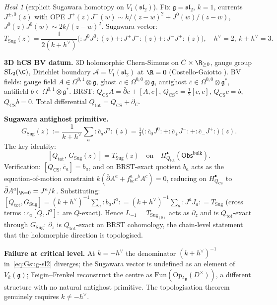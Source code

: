 \documentclass{article}
\theoremstyle{definition}
\theoremstyle{remark}
\newtheorem{heal}[theorem]{Heal}
\newcommand{\Obs}{\mathsf{Obs}}
\newcommand{\fg}{\mathfrak{g}}
\newcommand{\fsl}{\mathfrak{sl}}
\newcommand{\cA}{\mathcal{A}}
\newcommand{\Sug}{T_{\mathrm{Sug}}}
\newcommand{\Gsug}{G_{\mathrm{Sug}}}
\newcommand{\hv}{h^{\vee}}
\newcommand{\nord}[1]{{:}#1{:}}
\begin{document}
\begin{heal}[explicit Sugawara homotopy on $V_1(\fsl_2)$]
Fix $\fg = \fsl_2$, $k = 1$, currents $J^{\pm, 0}(z)$ with OPE
$J^+(z)J^-(w) \sim k/(z-w)^2 + J^0(w)/(z-w)$,
$J^0(z)J^0(w)\sim 2k/(z-w)^2$. Sugawara vector:
\begin{equation}\label{eq:sug-sl2}
 \Sug(z) = \frac{1}{2(k+\hv)}\bigl(
 \nord{J^0 J^0}(z) + \nord{J^+ J^-}(z) + \nord{J^- J^+}(z)\bigr),
 \quad \hv = 2,\ k+\hv = 3.
\end{equation}

\textbf{3D hCS BV datum.} 3D holomorphic Chern-Simons on
$C\times\R_{\geq 0}$, gauge group $\mathrm{SL}_2(\C)$, Dirichlet
boundary $\cA = V_1(\fsl_2)$ at $\R = 0$ (Costello-Gaiotto
\cite{CostelloGaiotto}). BV fields: gauge field $A\in\Omega^{0,1}
\otimes\fg$, ghost $c\in\Omega^{0,0}\otimes\fg$, antighost
$\bar c\in\Omega^{0,0}\otimes\fg^*$, antifield $b\in\Omega^{0,1}\otimes
\fg^*$. BRST: $Q_{\mathrm{CS}} A = \bar\partial c + [A,c]$,
$Q_{\mathrm{CS}} c = \tfrac12[c,c]$, $Q_{\mathrm{CS}}\bar c = b$,
$Q_{\mathrm{CS}} b = 0$. Total differential
$Q_{\mathrm{tot}} = Q_{\mathrm{CS}} + \bar\partial_C$.

\textbf{Sugawara antighost primitive.}
\begin{equation}\label{eq:Gsug-sl2}
 \Gsug(z) := \frac{1}{k+\hv}\sum_a \nord{\bar c_a J^a}(z)
 = \tfrac{1}{3}\bigl(\nord{\bar c_0 J^0} +
 \nord{\bar c_+ J^-} + \nord{\bar c_- J^+}\bigr)(z).
\end{equation}
The key identity:
\begin{equation}\label{eq:sug-homotopy}
 [Q_{\mathrm{tot}},\, \Gsug(z)] = \Sug(z)
 \quad\text{on}\quad H^{\bullet}_{Q_{\mathrm{tot}}}(\Obs^{\mathrm{bulk}}).
\end{equation}
Verification: $[Q_{\mathrm{CS}}, \bar c_a] = b_a$, and on BRST-exact
quotient $b_a$ acts as the equation-of-motion constraint
$k(\bar\partial A^a + f^a_{bc}c^b A^c) = 0$, reducing on
$H^{\bullet}_{Q_{\mathrm{CS}}}$ to $\bar\partial A^a|_{\R=0} = J^a/k$.
Substituting: $[Q_{\mathrm{tot}}, \Gsug] = (k+\hv)^{-1}\sum_a
\nord{b_a J^a} = (k+\hv)^{-1}\sum_a \nord{J^a J_a} = \Sug$ (cross
terms $\nord{\bar c_a [Q, J^a]}$ are $Q$-exact). Hence $L_{-1} =
\Sug_{(0)}$ acts as $\partial_z$ and is $Q_{\mathrm{tot}}$-exact
through $\Gsug$: $\partial_z$ is $Q_{\mathrm{tot}}$-exact on BRST
cohomology, the chain-level statement that the holomorphic direction
is topologised.

\textbf{Failure at critical level.} At $k = -\hv$ the denominator
$(k+\hv)^{-1}$ in~\eqref{eq:Gsug-sl2} diverges; the Sugawara vector
is undefined as an element of $V_k(\fg)$; Feigin--Frenkel reconstruct
the centre as $\mathrm{Fun}(\mathrm{Op}_{^L\fg}(D^{\times}))$, a
different structure with no natural antighost primitive. The
topologisation theorem genuinely requires $k\neq -\hv$.


\end{heal}
\end{document}
